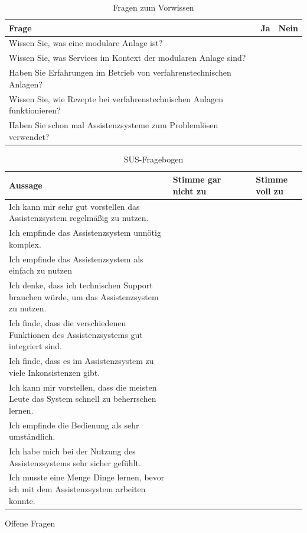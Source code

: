 \begin{table}[htbp]
\caption{Fragen zum Vorwissen}
\centering
\begin{tabular}{|p{}|l|l|}
\hline
Frage & Ja & Nein \\
\hline
Wissen Sie, was eine modulare Anlage ist? & & \\
\hline
Wissen Sie, was Services im Kontext der modularen Anlage sind? & & \\
\hline
Haben Sie Erfahrungen im Betrieb von verfahrenstechnischen Anlagen? & & \\
\hline
Wissen Sie, wie Rezepte bei verfahrenstechnischen Anlagen funktionieren? & & \\
\hline
Haben Sie schon mal Assistenzsysteme zum Problemlösen verwendet? & & \\
\hline 
\end{tabular}
\end{table}

\begin{table}[htbp]
\caption{SUS-Fragebogen}
\centering
\begin{tabular}{|p{}|p{}|p{}|p{}|p{}|p{}|}
\hline
\textbf{Aussage} & Stimme gar nicht zu & & & & Stimme voll zu \\
\hline
Ich kann mir sehr gut vorstellen das Assistenzsystem regelmäßig zu nutzen. & & & & & \\
\hline
Ich empfinde das Assistenzsystem unnötig komplex. & & & & & \\
\hline
Ich empfinde das Assistenzsystem als einfach zu nutzen & & & & & \\
\hline
Ich denke, dass ich technischen Support brauchen würde, um das Assistenzsystem zu nutzen. & & & & & \\
\hline
Ich finde, dass die verschiedenen Funktionen des Assistenzsystems gut integriert sind. & & & & & \\
\hline
Ich finde, dass es im Assistenzsystem zu viele Inkonsistenzen gibt. & & & & & \\
\hline
Ich kann mir vorstellen, dass die meisten Leute das System schnell zu beherrschen lernen. & & & & & \\
\hline
Ich empfinde die Bedienung als sehr umständlich. & & & & & \\
\hline
Ich habe mich bei der Nutzung des Assistenzsystems sehr sicher gefühlt. & & & & & \\
\hline
Ich musste eine Menge Dinge lernen, bevor ich mit dem Assistenzsystem arbeiten konnte. & & & & & \\
\hline
\end{tabular}
\end{table}

Offene Fragen 